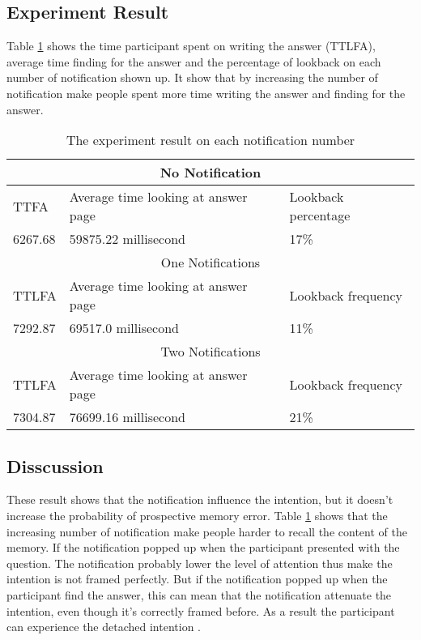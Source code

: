 \subsection{Experiment Result}
Table \ref{tab:notifiactionNumber} shows the time participant spent on writing the answer (TTLFA), average time finding for the answer
and the percentage of lookback on each number of notification shown up.
It show that by increasing the number of notification make people spent more time writing the answer and finding for the answer.

\begin{table}[]
\centering
\begin{tabular}{|l|l|l|}
\hline
\multicolumn{3}{|c|}{No Notification}                      \\ \hline
TTFA    & Average time looking  at answer page & Lookback percentage \\ \hline
6267.68 & 59875.22 millisecond                   & 17\%                   \\ \hline
\multicolumn{3}{|c|}{One Notifications}                     \\ \hline
TTLFA   & Average time looking at answer page  & Lookback frequency \\ \hline
7292.87 & 69517.0 millisecond                    & 11\%                 \\ \hline
\multicolumn{3}{|c|}{Two Notifications}                      \\ \hline
TTLFA   & Average time looking at answer page  & Lookback frequency \\ \hline
7304.87 & 76699.16  millisecond                   & 21\%                 \\ \hline
\end{tabular}
\caption{The experiment result on each notification number}
\label{tab:notifiactionNumber}
\end{table}

\subsection{Disscussion}
These result shows that the notification influence the intention, but it doesn't increase the probability of prospective memory error.
Table \ref{tab:notifiactionNumber} shows that the increasing number of notification make people harder to recall the content of the memory.
If the notification popped up when the participant presented with the question. The notification probably lower the level of attention thus make
the intention is not framed perfectly. But if the notification popped up when the participant find the answer, this can mean that the notification attenuate the intention,
even though it's correctly framed before. As a result the participant can experience the detached intention \citep{Reason1984}.

